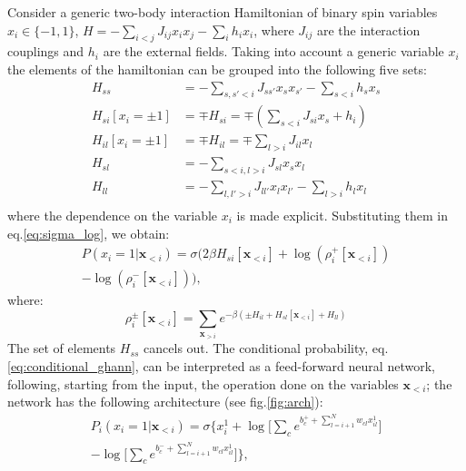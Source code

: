 \documentclass[aps,physrev,10pt,floatfix,reprint]{revtex4-2}
\begin{document}
Consider a generic two-body interaction Hamiltonian of binary spin variables $x_i \in \{-1,1\}$, $H = -\sum_{i<j} J_{ij} x_i x_j - \sum_{i} h_i x_i$, where $J_{ij}$ are the interaction couplings and $h_i$ are the external fields. Taking into account a generic variable $x_i$ the elements of the hamiltonian can be grouped into the following five sets:
\begin{align*}
    H_{ss} &= -\sum_{s,s'<i}J_{ss'} x_s x_{s'} - \sum_{s<i} h_s x_s \\
    H_{si}[x_i=\pm 1] & =  \mp H_{si} = \mp (\sum_{s<i} J_{si} x_s + h_i)  \\
    H_{il}[x_i = \pm 1] & = \mp H_{il} = \mp \sum_{l>i} J_{il} x_l\\
    H_{sl} &= -\sum_{s<i,l>i}J_{sl} x_s x_{l}\\
    H_{ll} &= -\sum_{l,l'>i}J_{ll'} x_l x_{l'} - \sum_{l>i} h_l x_l \\
\end{align*}
where the dependence on the variable $x_i$ is made explicit. Substituting them in eq.\ref{eq:sigma_log}, we obtain:
\begin{equation}
    \label{eq:conditional_ghann}
    \begin{split}
     P\left(x_{i}=1|\mathbf{x}_{<i}\right) = \sigma\bigg( 2 \beta H_{si}[\mathbf{x}_{<i}] +\log(\rho_i^+[\mathbf{x}_{<i}]) \\
     - \log(\rho_i^-[\mathbf{x}_{<i}])
    \bigg),   
    \end{split}
\end{equation}
where:
\begin{equation}
    \rho_i^{\pm} [\mathbf{x}_{<i}]  = \sum_{\mathbf{x}_{>i}}  e^{-\beta(\pm H_{il} + H_{sl}[\mathbf{x}_{<i}] + H_{ll})}
\label{eq:rho_ghann}
\end{equation}
The set of elements $H_{ss}$ cancels out.
The conditional probability, eq.\ref{eq:conditional_ghann}, can be interpreted as
 a feed-forward neural network, following, starting from the input, the operation done on the variables $\mathbf{x}_{<i}$; the network has the following architecture (see fig.\ref{fig:arch}):
\begin{multline}
    \label{eq:H2ANN}
        P_i\left(x_i=1 | \mathbf{x}_{<i}\right) = 
     \sigma \bigg\{ x_i^1 + \log\big[ \sum_{c} e^{b_c^+ + \sum_{l=i+1}^{N} w_{cl} x_{il}^1}\big]\\
     -\log\big[ \sum_{c} e^{b_c^- + \sum_{l=i+1}^{N} w_{cl} x_{il}^1}\big] \bigg\},
\end{multline}
\end{document}
